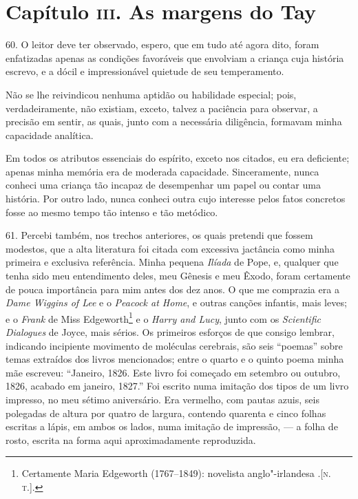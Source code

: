 \chapter{Capítulo \textsc{iii}. As margens do Tay}

60. O leitor deve ter observado, espero, que em tudo até agora dito,
foram enfatizadas apenas as condições favoráveis que envolviam a criança
cuja história escrevo, e a dócil e impressionável quietude de seu
temperamento.

Não se lhe reivindicou nenhuma aptidão ou habilidade especial; pois,
verdadeiramente, não existiam, exceto, talvez a paciência para observar,
a precisão em sentir, as quais, junto com a necessária diligência,
formavam minha capacidade analítica.

Em todos os atributos essenciais do espírito, exceto nos citados, eu era
deficiente; apenas minha memória era de moderada capacidade.
Sinceramente, nunca conheci uma criança tão incapaz de desempenhar um
papel ou contar uma história. Por outro lado, nunca conheci outra cujo
interesse pelos fatos concretos fosse ao mesmo tempo tão intenso e tão
metódico.

61. Percebi também, nos trechos anteriores, os quais pretendi que fossem
modestos, que a alta literatura foi citada com excessiva jactância como
minha primeira e exclusiva referência. Minha pequena \emph{Ilíada} de
Pope, e, qualquer que tenha sido meu entendimento deles, meu Gênesis e
meu Êxodo, foram certamente de pouca importância para mim antes dos dez
anos. O que me comprazia era a \emph{Dame Wiggins of Lee} e o
\emph{Peacock at Home}, e outras canções infantis, mais leves; e o
\emph{Frank} de Miss Edgeworth\footnote{Certamente Maria Edgeworth
  (1767--1849): novelista anglo"-irlandesa .{[}\textsc{n.\,t.}{]}.} e o
\emph{Harry and Lucy}, junto com os \emph{Scientific} \emph{Dialogues}
de Joyce, mais sérios. Os primeiros esforços de que consigo lembrar,
indicando incipiente movimento de moléculas cerebrais, são seis
``poemas'' sobre temas extraídos dos livros mencionados; entre o quarto
e o quinto poema minha mãe escreveu: ``Janeiro, 1826. Este livro foi
começado em setembro ou outubro, 1826, acabado em janeiro, 1827.'' Foi
escrito numa imitação dos tipos de um livro impresso, no meu sétimo
aniversário. Era vermelho, com pautas azuis, seis polegadas de altura
por quatro de largura, contendo quarenta e cinco folhas escritas a
lápis, em ambos os lados, numa imitação de impressão, --- a folha de
rosto, escrita na forma aqui aproximadamente reproduzida.

